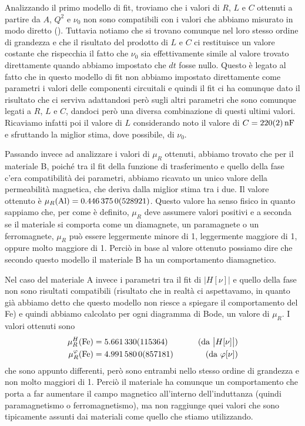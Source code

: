 \documentclass[
    prl,
    floatfix,
    reprint, 
    superscriptaddress, 
    altaffilletter, 
    amsmath, 
    amssymb, 
    a4paper]{revtex4-2}
\begin{document}
Analizzando il primo modello di fit, troviamo che i valori di $R$, $L$ e $C$ ottenuti a partire da $A$, $Q^2$ e $\nu_0$ non sono compatibili con i valori che abbiamo misurato in modo diretto (). Tuttavia notiamo che si trovano comunque nel loro stesso ordine di grandezza e che il risultato del prodotto di $L$ e $C$ ci restituisce un valore costante che rispecchia il fatto che $\nu_0$ sia effettivamente simile al valore trovato direttamente quando abbiamo impostato che $dt$ fosse nullo. Questo è legato al fatto che in questo modello di fit non abbiamo impostato direttamente come parametri i valori delle componenti circuitali e quindi il fit ci ha comunque dato il risultato che ci serviva adattandosi però sugli altri parametri che sono comunque legati a $R$, $L$ e $C$, dandoci però una diversa combinazione di questi ultimi valori. Ricaviamo infatti poi il valore di $L$ considerando noto il valore di $C=\SI{220+-2}{\nano\farad}$ e sfruttando la miglior stima, dove possibile, di $\nu_0$.

Passando invece ad analizzare i valori di $\mu_R$ ottenuti, abbiamo trovato che per il materiale B, poiché tra il fit della funzione di trasferimento e quello della fase c'era compatibilità dei parametri, abbiamo ricavato un unico valore della permeabilità magnetica, che deriva dalla miglior stima tra i due. Il valore ottenuto è $\mu_R(\text{Al})=\num{0.446375 +- 0.0528921}$. Questo valore ha senso fisico in quanto sappiamo che, per come è definito, $\mu_R$ deve assumere valori positivi e a seconda se il materiale si comporta come un diamagnete, un paramagnete o un ferromagnete, $\mu_R$ può essere leggermente minore di 1, leggermente maggiore di 1, oppure molto maggiore di 1. Perciò in base al valore ottenuto possiamo dire che secondo questo modello il materiale B ha un comportamento diamagnetico. 

Nel caso del materiale A invece i parametri tra il fit di $\big|H[\nu]\big|$ e quello della fase non sono risultati compatibili (risultato che in realtà ci aspettavamo, in quanto già abbiamo detto che questo modello non riesce a spiegare il comportamento del Fe) e quindi abbiamo calcolato per ogni diagramma di Bode, un valore di $\mu_R$. I valori ottenuti sono 
\begin{align*}
    \mu_R^H(\text{Fe}) &= \num{5.66133 +- 0.115364}~~~~~~&\text{(da $\big|H[\nu]\big|$)}\\
    \mu_R^\varphi (\text{Fe}) &= \num{4.99158 +- 0.0857181}~~~~~~&\text{(da $\varphi[\nu]$)}
\end{align*}
che sono appunto differenti, però sono entrambi nello stesso ordine di grandezza e non molto maggiori di 1. Perciò il materiale ha comunque un comportamento che porta a far aumentare il campo magnetico all'interno dell'induttanza (quindi paramagnetismo o ferromagnetismo), ma non raggiunge quei valori che sono tipicamente assunti dai materiali come quello che stiamo utilizzando.
\end{document}
